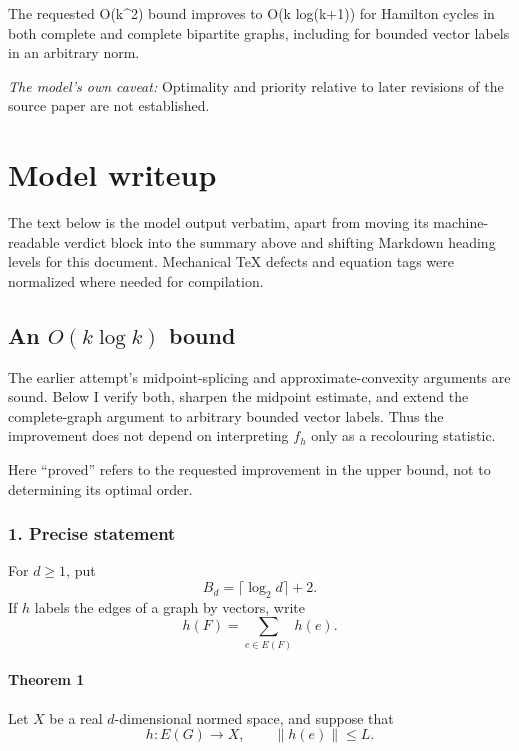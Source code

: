 \documentclass[
  11pt,
  a4paper,
]{article}
\begin{document}
The requested O(k\^{}2) bound improves to O(k log(k+1)) for Hamilton
cycles in both complete and complete bipartite graphs, including for
bounded vector labels in an arbitrary norm.

\emph{The model's own caveat:} Optimality and priority relative to later
revisions of the source paper are not established.

\section{Model writeup}\label{model-writeup}

The text below is the model output verbatim, apart from moving its
machine-readable verdict block into the summary above and shifting
Markdown heading levels for this document. Mechanical TeX defects and
equation tags were normalized where needed for compilation.

\subsection{\texorpdfstring{An \(O(k\log k)\)
bound}{An O(k\textbackslash log k) bound}}\label{an-oklog-k-bound}

The earlier attempt's midpoint-splicing and approximate-convexity
arguments are sound. Below I verify both, sharpen the midpoint estimate,
and extend the complete-graph argument to arbitrary bounded vector
labels. Thus the improvement does not depend on interpreting \(f_h\)
only as a recolouring statistic.

Here ``proved'' refers to the requested improvement in the upper bound,
not to determining its optimal order.

\subsubsection{1. Precise statement}\label{precise-statement}

For \(d\ge 1\), put \[
B_d=\lceil\log_2 d\rceil+2.
\] If \(h\) labels the edges of a graph by vectors, write \[
h(F)=\sum_{e\in E(F)}h(e).
\]

\paragraph{Theorem 1}\label{theorem-1}

Let \(X\) be a real \(d\)-dimensional normed space, and suppose that \[
h:E(G)\longrightarrow X,\qquad \|h(e)\|\le L.
\]
\end{document}
